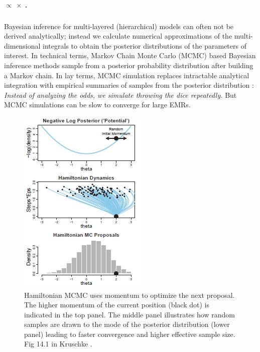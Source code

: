 \documentclass[11pt,notitlepage]{article}
\begin{document}
\subparagraph*{ $\propto$  $\times$ .}

Bayesian inference for multi-layered (hierarchical) models can often not be derived analytically; instead we calculate numerical approximations of the multi-dimensional integrals to obtain the posterior distributions of the parameters of interest. In technical terms, Markov Chain Monte Carlo (MCMC) based Bayesian inference methods sample from a posterior probability distribution after building a Markov chain. In lay terms, MCMC simulation replaces intractable analytical integration with empirical summaries of samples from the posterior distribution \cite{Abrams_9483729}: \textit{Instead of analyzing the odds, we simulate throwing the dice repeatedly.} But MCMC simulations can be slow to converge for large EMRs.

\begin{figure}
 \vspace{-70pt}
 \includegraphics[scale=1]{Figures/Hamiltonian.png}
  \vspace{-30pt}
  \caption{\footnotesize Hamiltonian MCMC uses momentum to optimize the next proposal. The higher momentum of the current position (black dot) is indicated in the top panel. The middle panel illustrates how random samples are drawn to the mode of the posterior distribution (lower panel) leading to faster convergence and higher effective sample size. Fig 14.1 in Kruschke \cite{Kruschke_Book_2014}.}
    \label{fig:Hamiltonian}
 \vspace{- 1 pt}
\end{figure}
\end{document}
